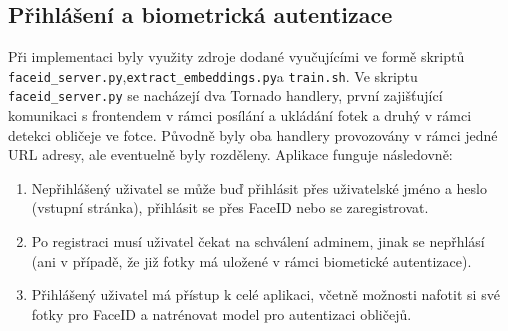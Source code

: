 \subsection{Přihlášení a biometrická autentizace}
Při implementaci byly využity zdroje dodané vyučujícími ve formě skriptů \verb|faceid_server.py|,\newline \verb|extract_embeddings.py|a \verb|train.sh|.
Ve skriptu \verb|faceid_server.py| se nacházejí dva Tornado handlery, první zajišťující komunikaci s frontendem v rámci posílání a ukládání fotek a druhý v rámci detekci obličeje ve fotce.
Původně byly oba handlery provozovány v rámci jedné URL adresy, ale eventuelně byly rozděleny. Aplikace funguje následovně:
\begin{enumerate}
    \item Nepřihlášený uživatel se může buď přihlásit přes uživatelské jméno a heslo (vstupní stránka), přihlásit se přes FaceID nebo se zaregistrovat.
    \item Po registraci musí uživatel čekat na schválení adminem, jinak se nepřhlásí (ani v případě, že již fotky má uložené v rámci biometické autentizace).
    \item Přihlášený uživatel má přístup k celé aplikaci, včetně možnosti nafotit si své fotky pro FaceID a natrénovat model pro autentizaci obličejů.
\end{enumerate} 

